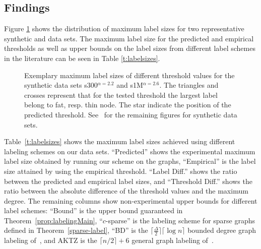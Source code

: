 \subsection{Findings}
Figure \ref{fig:findings} shows the distribution of maximum label sizes for two representative synthetic and  data sets. The maximum label size
for the predicted and empirical thresholds as well as upper bounds on the label sizes from different label schemes in the literature can be seen in Table \ref{t:labelsizes}. 

\begin{figure}[!ht]
\centering
{}\hspace*{-2.5em}
%
\caption{Exemplary maximum label sizes of different threshold values for the synthetic data sets   s300$^{\alpha=2.2}$ and s1M$^{\alpha=2.6}$. 
The triangles and crosses represent that for the tested threshold the largest label belong to fat, resp. thin node. The star indicate the position of the predicted threshold.
See~\cite{} for the remaining  figures for synthetic data sets.}
\label{fig:findings}%
\end{figure}

%




Table~\ref{t:labelsizes}  shows  the maximum label sizes achieved using different labeling schemes on our data sets. ``Predicted'' shows the experimental maximum label size obtained by running our scheme on the graphs, ``Empirical'' is the label size attained by using the empirical threshold.
``Label Diff.'' shows the ratio between the predicted and empirical label sizes, and  ``Threshold Diff.'' shows the ratio between the absolute difference of the threshold values and the maximum degree.
 The remaining columns show non-experimental upper bounds for different label schemes: ``Bound'' is the upper bound guaranteed in Theorem~\ref{prop:labelingMain}, ``$c$-sparse'' is  the labeling scheme for sparse graphs defined in Theorem~\ref{sparse-label}, ``BD'' is the $\lceil \frac{\Delta}{2} \rceil \lceil \log n\rceil$ bounded degree graph  labeling of~\cite{adjiashvili2014labeling}, and AKTZ is the $\lceil n/2\rceil+6$ general graph  labeling of~\cite{alstrup2014adjacency}.
 
